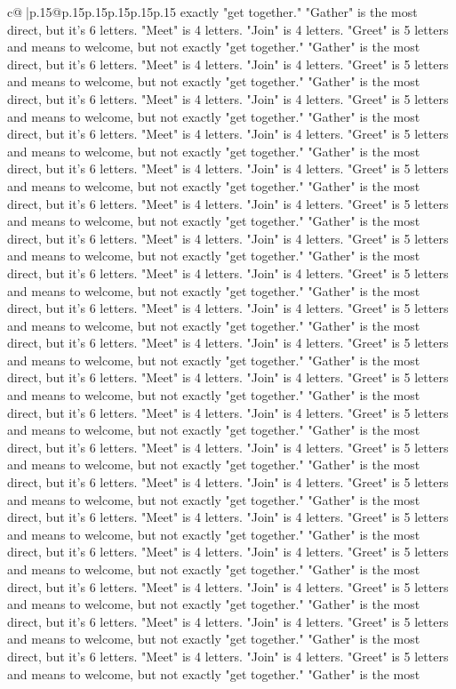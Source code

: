 \documentclass{article}
\begin{document}
{\begin{supertabular}{c@{$\;$}|p{.15\linewidth}@{}p{.15\linewidth}p{.15\linewidth}p{.15\linewidth}p{.15\linewidth}p{.15\linewidth}}
{{{exactly "get together." "Gather" is the most direct, but it's 6 letters. "Meet" is 4 letters. "Join" is 4 letters. "Greet" is 5 letters and means to welcome, but not exactly "get together." "Gather" is the most direct, but it's 6 letters. "Meet" is 4 letters. "Join" is 4 letters. "Greet" is 5 letters and means to welcome, but not exactly "get together." "Gather" is the most direct, but it's 6 letters. "Meet" is 4 letters. "Join" is 4 letters. "Greet" is 5 letters and means to welcome, but not exactly "get together." "Gather" is the most direct, but it's 6 letters. "Meet" is 4 letters. "Join" is 4 letters. "Greet" is 5 letters and means to welcome, but not exactly "get together." "Gather" is the most direct, but it's 6 letters. "Meet" is 4 letters. "Join" is 4 letters. "Greet" is 5 letters and means to welcome, but not exactly "get together." "Gather" is the most direct, but it's 6 letters. "Meet" is 4 letters. "Join" is 4 letters. "Greet" is 5 letters and means to welcome, but not exactly "get together." "Gather" is the most direct, but it's 6 letters. "Meet" is 4 letters. "Join" is 4 letters. "Greet" is 5 letters and means to welcome, but not exactly "get together." "Gather" is the most direct, but it's 6 letters. "Meet" is 4 letters. "Join" is 4 letters. "Greet" is 5 letters and means to welcome, but not exactly "get together." "Gather" is the most direct, but it's 6 letters. "Meet" is 4 letters. "Join" is 4 letters. "Greet" is 5 letters and means to welcome, but not exactly "get together." "Gather" is the most direct, but it's 6 letters. "Meet" is 4 letters. "Join" is 4 letters. "Greet" is 5 letters and means to welcome, but not exactly "get together." "Gather" is the most direct, but it's 6 letters. "Meet" is 4 letters. "Join" is 4 letters. "Greet" is 5 letters and means to welcome, but not exactly "get together." "Gather" is the most direct, but it's 6 letters. "Meet" is 4 letters. "Join" is 4 letters. "Greet" is 5 letters and means to welcome, but not exactly "get together." "Gather" is the most direct, but it's 6 letters. "Meet" is 4 letters. "Join" is 4 letters. "Greet" is 5 letters and means to welcome, but not exactly "get together." "Gather" is the most direct, but it's 6 letters. "Meet" is 4 letters. "Join" is 4 letters. "Greet" is 5 letters and means to welcome, but not exactly "get together." "Gather" is the most direct, but it's 6 letters. "Meet" is 4 letters. "Join" is 4 letters. "Greet" is 5 letters and means to welcome, but not exactly "get together." "Gather" is the most direct, but it's 6 letters. "Meet" is 4 letters. "Join" is 4 letters. "Greet" is 5 letters and means to welcome, but not exactly "get together." "Gather" is the most direct, but it's 6 letters. "Meet" is 4 letters. "Join" is 4 letters. "Greet" is 5 letters and means to welcome, but not exactly "get together." "Gather" is the most direct, but it's 6 letters. "Meet" is 4 letters. "Join" is 4 letters. "Greet" is 5 letters and means to welcome, but not exactly "get together." "Gather" is the most direct, but it's 6 letters. "Meet" is 4 letters. "Join" is 4 letters. "Greet" is 5 letters and means to welcome, but not exactly "get together." "Gather" is the most }}}
\end{supertabular}}
\end{document}
